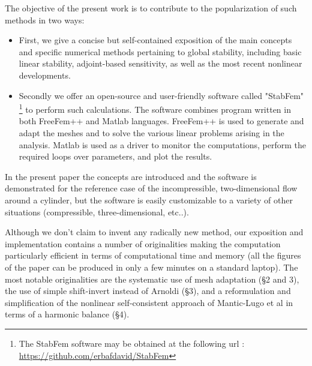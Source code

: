 \documentclass[twocolumn,10pt]{asme2ej}
\begin{document}





The objective of the present work is to contribute to the popularization of such methods 
in two ways:
\begin{itemize}
\item
First, we give a concise but self-contained exposition of the main concepts and 
specific numerical methods pertaining to global stability, including basic linear stability, adjoint-based sensitivity, as well as the most recent nonlinear developments.
\item
Secondly we offer an open-source and user-friendly software called  "StabFem"
\cprotect\footnote{The StabFem software may be obtained at the following url : 
\url{https://github.com/erbafdavid/StabFem}} 
to perform such calculations. The software combines program written in both FreeFem++ and Matlab languages. 
FreeFem++ is used to generate and adapt the meshes and to solve the various linear problems arising in the analysis. Matlab is used as a driver to monitor the computations, perform the required loops over parameters, and plot the results.
\end{itemize}

In the present paper the concepts are introduced and the software is demonstrated for the reference case of the incompressible, two-dimensional flow around a cylinder, but the software is easily customizable to a variety of other situations (compressible, three-dimensional, etc..).

Although we don't claim to invent any radically new method, our exposition and implementation contains a number of originalities making the computation particularly efficient in terms of computational time and memory (all the figures of the paper can be produced in only a few minutes on a standard laptop). The most notable originalities are the systematic use of mesh adaptation (\S 2 and 3), the use of simple shift-invert instead of Arnoldi (\S 3), and a reformulation and simplification of the nonlinear self-consistent approach of Mantic-Lugo et al in terms of a harmonic balance (\S 4).
 
\end{document}
